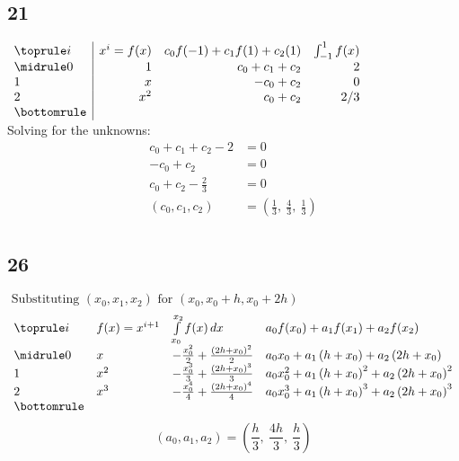 \documentclass{oisinclass}
\begin{document}
\subsection*{21}
\(
\begin{array}{l|rrr}
	\toprule
	i & x^i = f(x) & c_0f(-1) + c_1f(1) + c_2(1) & \int_{-1}^{1}f(x) \\
	\midrule
	0 & 1          & c_0 + c_1 + c_2             & 2                 \\
	1 & x          & -c_0 + c_2                  & 0                 \\
	2 & x^2        & c_0 + c_2                   & 2/3               \\
	\bottomrule
\end{array}
\) \\[5ex]
Solving for the unknowns:
\begin{align*}
	c_{0} + c_{1} + c_{2} - 2   & = 0                                                         \\
	- c_{0} + c_{2}             & = 0                                                         \\
	c_{0} + c_{2} - \frac{2}{3} & = 0                                                         \\
	(c_0, c_1, c_2)             & = \left( \frac{1}{3}, \  \frac{4}{3}, \  \frac{1}{3}\right) \\
\end{align*}
\subsection*{26}
\(\text{ Substituting } (x_0, x_1, x_2) \text{ for } (x_0, x_0 + h, x_0 + 2h)\)
\[
	\begin{array}{llll}
		\toprule
		i & f(x) = x^{i+1} & \int\limits_{x_{0}}^{x_{2}} f(x)\, dx                          & a_{0} f(x_{0}) + a_{1} f(x_{1}) + a_{2} f(x_{2})                                        \\
		\midrule
		0 & x              & - \frac{x_{0}^{2}}{2} + \frac{\left(2 h + x_{0}\right)^{2}}{2} & a_{0} x_{0} + a_{1} \left(h + x_{0}\right) + a_{2} \left(2 h + x_{0}\right)             \\
		1 & x^{2}          & - \frac{x_{0}^{3}}{3} + \frac{\left(2 h + x_{0}\right)^{3}}{3} & a_{0} x_{0}^{2} + a_{1} \left(h + x_{0}\right)^{2} + a_{2} \left(2 h + x_{0}\right)^{2} \\
		2 & x^{3}          & - \frac{x_{0}^{4}}{4} + \frac{\left(2 h + x_{0}\right)^{4}}{4} & a_{0} x_{0}^{3} + a_{1} \left(h + x_{0}\right)^{3} + a_{2} \left(2 h + x_{0}\right)^{3} \\
		\bottomrule
	\end{array}
\]
\[
	(a_0, a_1, a_2) = \left( \frac{h}{3}, \  \frac{4 h}{3}, \  \frac{h}{3}\right)
\]
\end{document}
